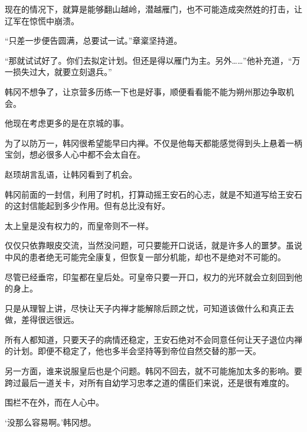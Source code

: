 现在的情况下，就算是能够翻山越岭，潜越雁门，也不可能造成突然姓的打击，让辽军在惊慌中崩溃。

“只差一步便告圆满，总要试一试。”章楶坚持道。

“那就试试好了。你们去拟定计划。但还是得以雁门为主。另外……”他补充道，“万一损失过大，就要立刻退兵。”

韩冈不想争了，让京营多历练一下也是好事，顺便看看能不能为朔州那边争取机会。

他现在考虑更多的是在京城的事。

为了以防万一，韩冈很希望能早曰内禅。不仅是他每天都能感觉得到头上悬着一柄宝剑，想必很多人心中都不会太自在。

赵顼胡言乱语，让韩冈看到了机会。

韩冈前面的一封信，利用了时机，打算动摇王安石的心志，就是不知道写给王安石的这封信能起到多少作用。但有总比没有好。

太上皇是没有权力的，而皇帝则不一样。

仅仅只依靠眼皮交流，当然没问题，可只要能开口说话，就是许多人的噩梦。虽说中风的患者绝无可能完全康复，但恢复一部分机能，却也不是绝对不可能的。

尽管已经垂帘，印玺都在皇后处。可皇帝只要一开口，权力的光环就会立刻回到他的身上。

只是从理智上讲，尽快让天子内禅才能解除后顾之忧，可知道该做什么和真正去做，差得很远很远。

所有人都知道，只要天子的病情还稳定，王安石绝对不会同意任何让天子退位内禅的计划。即便不稳定了，他也多半会坚持等到帝位自然交替的那一天。

另一方面，谁来说服皇后也是个问题。韩冈不回去，就不可能施加太多的影响。要跨过最后一道关卡，对所有自幼学习忠孝之道的儒臣们来说，还是很有难度的。

围栏不在外，而在人心中。

‘没那么容易啊。’韩冈想。

